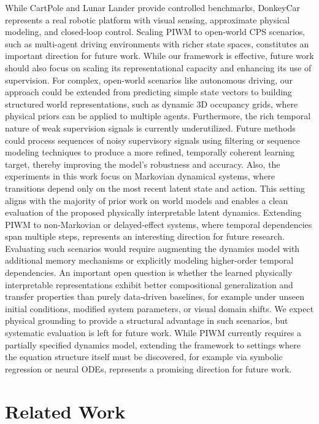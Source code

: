 \documentclass[nonacm,sigconf]{acmart}
\begin{document}
While CartPole and Lunar Lander provide controlled benchmarks, DonkeyCar represents a real robotic platform with visual sensing, approximate physical modeling, and closed-loop control. Scaling PIWM to open-world CPS scenarios, such as multi-agent driving environments with richer state spaces, constitutes an important direction for future work. While our framework is effective, future work should also focus on scaling its representational capacity and enhancing its use of supervision. For complex, open-world scenarios like autonomous driving, our approach could be extended from predicting simple state vectors to building structured world representations, such as dynamic 3D occupancy grids, where physical priors can be applied to multiple agents. Furthermore, the rich temporal nature of weak supervision signals is currently underutilized. Future methods could process sequences of noisy supervisory signals using filtering or sequence modeling techniques to produce a more refined, temporally coherent learning target, thereby improving the model's robustness and accuracy. Also, the experiments in this work focus on Markovian dynamical systems, where transitions depend only on the most recent latent state and action. This setting aligns with the majority of prior work on world models and enables a clean evaluation of the proposed physically interpretable latent dynamics. Extending PIWM to non-Markovian or delayed-effect systems, where temporal dependencies span multiple steps, represents an interesting direction for future research. Evaluating such scenarios would require augmenting the dynamics model with additional memory mechanisms or explicitly modeling higher-order temporal dependencies. An important open question is whether the learned physically interpretable representations exhibit better compositional generalization and transfer properties than purely data-driven baselines, for example under unseen initial conditions, modified system parameters, or visual domain shifts. We expect physical grounding to provide a structural advantage in such scenarios, but systematic evaluation is left for future work. While PIWM currently requires a partially specified dynamics model, extending the framework to settings where the equation structure itself must be discovered, for example via symbolic regression or neural ODEs, represents a promising direction for future work.


 

\section{Related Work}\label{related}
\end{document}
